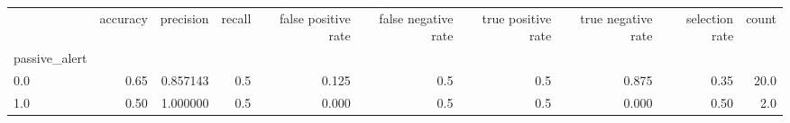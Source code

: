 \begin{tabular}{lrrrrrrrrr}
\toprule
{} &  accuracy &  precision &  recall &  false positive rate &  false negative rate &  true positive rate &  true negative rate &  selection rate &  count \\
passive\_alert &           &            &         &                      &                      &                     &                     &                 &        \\
\midrule
0.0           &      0.65 &   0.857143 &     0.5 &                0.125 &                  0.5 &                 0.5 &               0.875 &            0.35 &   20.0 \\
1.0           &      0.50 &   1.000000 &     0.5 &                0.000 &                  0.5 &                 0.5 &               0.000 &            0.50 &    2.0 \\
\bottomrule
\end{tabular}
